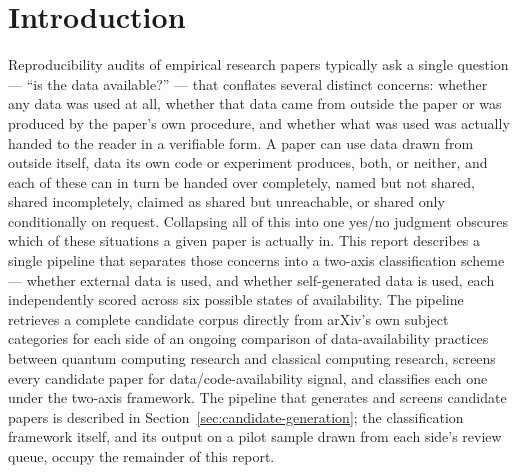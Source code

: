 \section{Introduction}

Reproducibility audits of empirical research papers typically ask a single question ---
``is the data available?'' --- that conflates several distinct concerns: whether any
data was used at all, whether that data came from outside the paper or was produced by
the paper's own procedure, and whether what was used was actually handed to the reader
in a verifiable form. A paper can use data drawn from outside itself, data its own code
or experiment produces, both, or neither, and each of these can in turn be handed over
completely, named but not shared, shared incompletely, claimed as shared but
unreachable, or shared only conditionally on request. Collapsing all of this into one
yes/no judgment obscures which of these situations a given paper is actually in. This
report describes a single pipeline that separates those concerns into a two-axis
classification scheme --- whether external data is used, and whether self-generated
data is used, each independently scored across six possible states of availability.
The pipeline retrieves a complete candidate corpus directly from arXiv's own subject
categories for each side of an ongoing comparison of data-availability practices
between quantum computing research and classical computing research, screens every
candidate paper for data/code-availability signal, and classifies each one under the
two-axis framework. The pipeline that generates and screens candidate papers is
described in Section~\ref{sec:candidate-generation}; the classification framework
itself, and its output on a pilot sample drawn from each side's review queue, occupy
the remainder of this report.
